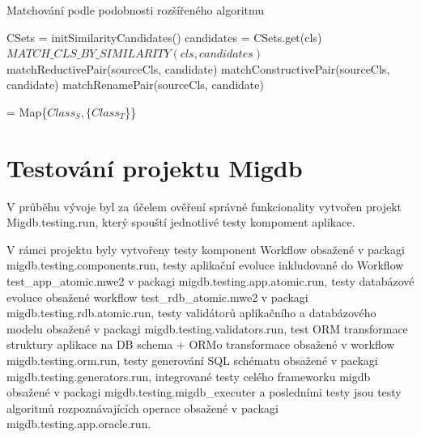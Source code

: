 \documentclass[11pt,twoside,a4paper]{book}
\begin{document}
\FloatBarrier
 
\begin{algorithm}
 \caption{Matchování podle podobnosti rozšířeného
 algoritmu}\label{algo:matching_ext:match_similarity}
 \begin{algorithmic}[1]
    \State CSets = initSimilarityCandidates() 
          \State candidates = CSets.get(cls)
          \State $MATCH\_CLS\_BY\_SIMILARITY(cls, candidates)$
       \EndFor
    \EndFor
 \EndProcedure
 \Statex
 	         \State {}
 	      \Else
 	         \State matchReductivePair(sourceCls, candidate)
 	      \EndIf
 	   \Else
 	         \State matchConstructivePair(sourceCls, candidate)
 	      \Else
 	         \State matchRenamePair(sourceCls, candidate)
 	      \EndIf
 	   \EndIf 
 	\EndFor
 \EndProcedure
 \end{algorithmic}
\end{algorithm}

\FloatBarrier
 = Map\{$Class_S, \{Class_T$\}\}


\chapter{Testování projektu Migdb}\label{chapt:testování}

V průběhu vývoje byl za účelem ověření správné funkcionality vytvořen projekt
Migdb.testing.run, který spouští jednotlivé testy kompoment aplikace. 

V rámci projektu byly vytvořeny testy komponent Workflow obsažené v packagi
migdb.testing.components.run, testy aplikační evoluce inkludované do Workflow
test\_app\_atomic.mwe2 v packagi migdb.testing.app.atomic.run, testy databázové
evoluce obsažené workflow test\_rdb\_atomic.mwe2 v packagi
migdb.testing.rdb.atomic.run, testy validátorů aplikačního a databázového
modelu obsažené v packagi migdb.testing.validators.run, test ORM transformace
struktury aplikace na DB schema + ORMo transformace obsažené v workflow
migdb.testing.orm.run, testy generování SQL schématu obsažené v packagi
migdb.testing.generators.run, integrované testy celého frameworku migdb
obsažené v packagi migdb.testing.migdb\_executer a posledními testy jsou testy
algoritmů rozpoznávajících operace obsažené v packagi
migdb.testing.app.oracle.run.
\end{document}
